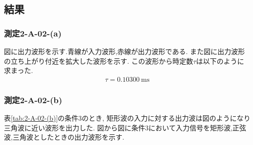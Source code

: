 \subsection{結果}
\subsubsection{測定2-A-02-(a)}
図に出力波形を示す.青線が入力波形,赤線が出力波形である.
また図に出力波形の立ち上がり付近を拡大した波形を示す.
この波形から時定数$\tau$は以下のように求まった.
\begin{align}
  \tau=0.10300\ \si{\milli\second}
\end{align}
\subsubsection{測定2-A-02-(b)}
表\ref{tab:2-A-02-(b)}の条件3のとき,
矩形波の入力に対する出力波は図のようになり三角波に近い波形を出力した.
図から図に条件3において入力信号を矩形波,正弦波,三角波としたときの出力波形を示す.

